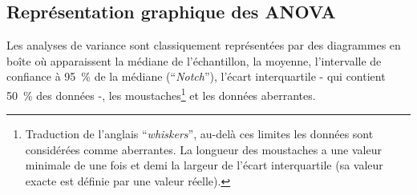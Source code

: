 \begin{appendices}
%	
%	
%	
%	
%	
%	
%	
%	
%	
%	
	
	\chapter{Représentation graphique des ANOVA} \label{app_anovas}
	
	Les analyses de variance sont classiquement représentées par des diagrammes en boîte où apparaissent la médiane de l'échantillon, la moyenne, l'intervalle de confiance à \SI{95}{\percent} de la médiane (\foreignquote{french}{\textit{Notch}}), l'écart interquartile - qui contient \SI{50}{\percent} des données -, les moustaches\footnote{Traduction de l'anglais \foreignquote{french}{\textit{whiskers}}, au-delà ces limites les données sont considérées comme aberrantes. La longueur des moustaches a une valeur minimale de une fois et demi la largeur de l'écart interquartile (sa valeur exacte est définie par une valeur réelle).} et les données aberrantes.
	

\end{appendices}
